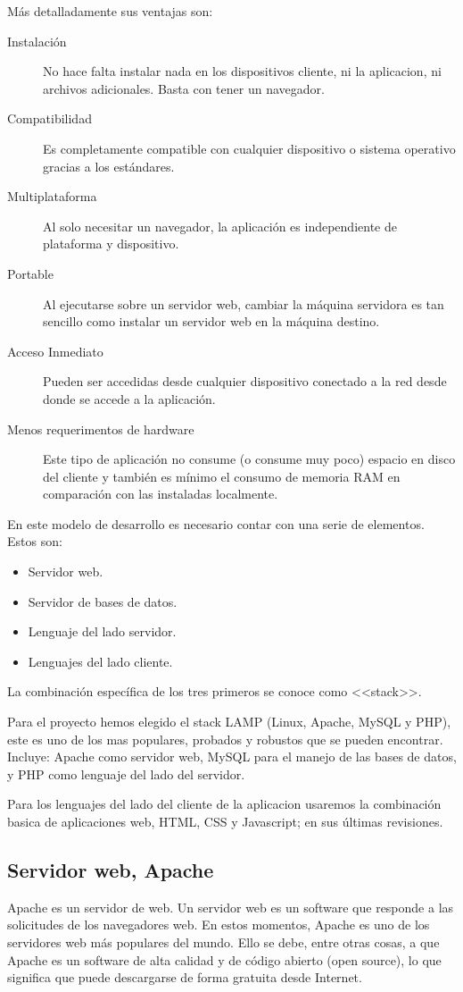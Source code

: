 Más detalladamente sus ventajas son:
\begin{description}
    \item[Instalación] No hace falta instalar nada en los dispositivos cliente, ni la aplicacion, ni archivos adicionales. Basta con tener un navegador.
    \item[Compatibilidad] Es completamente compatible con cualquier dispositivo o sistema operativo gracias a los estándares.
    \item[Multiplataforma] Al solo necesitar un navegador, la aplicación es independiente de plataforma y dispositivo.
    \item[Portable] Al ejecutarse sobre un servidor web, cambiar la máquina servidora es tan sencillo como instalar un servidor web en la máquina destino.
    \item[Acceso Inmediato] Pueden ser accedidas desde cualquier dispositivo conectado a la red desde donde se accede a la aplicación. 
    \item[Menos requerimentos de hardware] Este tipo de aplicación no consume (o consume muy poco) espacio en disco del cliente y también es mínimo el consumo de memoria RAM en comparación con las instaladas localmente.
\end{description}


En este modelo de desarrollo es necesario contar con una serie de elementos. Estos son:
\begin{itemize}
    \item Servidor web.
    \item Servidor de bases de datos.
    \item Lenguaje del lado servidor.
     \item Lenguajes del lado cliente.
   \end{itemize}
La combinación específica de los tres primeros se conoce como <<stack>>. 

Para el proyecto hemos elegido el stack LAMP (Linux, Apache, MySQL y PHP), este es uno de los mas populares, probados y robustos que se pueden encontrar. Incluye: Apache como servidor web, MySQL para el manejo de las bases de datos, y PHP como lenguaje del lado del servidor.

Para los lenguajes del lado del cliente de la aplicacion usaremos la combinación basica de aplicaciones web, HTML, CSS y Javascript; en sus últimas revisiones. 

\subsection{Servidor web, Apache}
Apache es un servidor de web. Un servidor web es un software que responde a las solicitudes de los navegadores web. En estos momentos, Apache es uno de los servidores web más populares del mundo. Ello se debe, entre otras cosas, a que Apache es un software de alta calidad y de código abierto (open source), lo que significa que puede descargarse de forma gratuita desde Internet.

